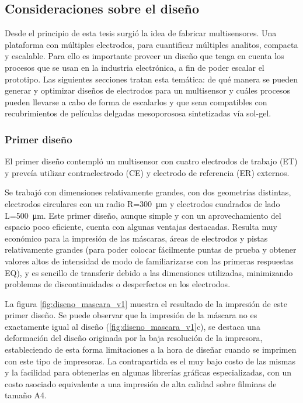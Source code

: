 	\subsection{Consideraciones sobre el diseño}\label{sec:diseno}

			 Desde el principio de esta tesis surgió la idea de fabricar multisensores. Una plataforma con múltiples electrodos, para cuantificar múltiples analitos, compacta y escalable. Para ello es importante proveer un diseño que tenga en cuenta los procesos que se usan en la industria electrónica, a fin de poder escalar el prototipo. Las siguientes secciones tratan esta temática: de qué manera se pueden generar y optimizar diseños de electrodos para un multisensor y cuáles procesos pueden llevarse a cabo de forma de escalarlos y que sean compatibles con recubrimientos de películas delgadas mesoporososa sintetizadas vía sol-gel.

		\subsubsection{Primer diseño}

		     El primer diseño contempló un multisensor con cuatro electrodos de trabajo (ET) y preveía utilizar contraelectrodo (CE) y electrodo de referencia (ER) externos. 

     	     Se trabajó con dimensiones relativamente grandes, con dos geometrías distintas, electrodos circulares con un radio R=\SI{300}{\um} y electrodos cuadrados de lado L=\SI{500}{\um}. Este primer diseño, aunque simple y con un aprovechamiento del espacio poco eficiente, cuenta con algunas ventajas destacadas. Resulta muy económico para la impresión de las máscaras, áreas de electrodos y pistas relativamente grandes (para poder colocar fácilmente puntas de prueba y obtener valores altos de intensidad de modo de familiarizarse con las primeras respuestas EQ), y es sencillo de transferir debido a las dimensiones utilizadas, minimizando problemas de discontinuidades o desperfectos en los electrodos.
		     		
		     La figura \ref{fig:diseno_mascara_v1} muestra el resultado de la impresión de este primer diseño. Se puede observar que la impresión de la máscara no es exactamente igual al diseño (\ref{fig:diseno_mascara_v1}c), se destaca una deformación del diseño originada por la baja resolución de la impresora, estableciendo de esta forma limitaciones a la hora de diseñar cuando se imprimen con este tipo de impresoras. La contrapartida es el muy bajo costo de las mismas y la facilidad para obtenerlas en algunas librerías gráficas especializadas, con un costo asociado equivalente a una impresión de alta calidad sobre filminas de tamaño A4.
					

